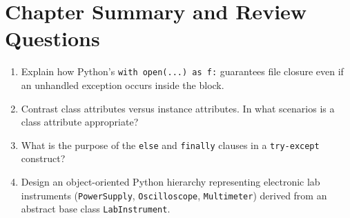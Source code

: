 \section{Chapter Summary and Review Questions}
\begin{enumerate}[leftmargin=1.8em, itemsep=4pt]
    \item Explain how Python's \texttt{with open(...) as f:} guarantees file closure even if an unhandled exception occurs inside the block.
    \item Contrast class attributes versus instance attributes. In what scenarios is a class attribute appropriate?
    \item What is the purpose of the \texttt{else} and \texttt{finally} clauses in a \texttt{try-except} construct?
    \item Design an object-oriented Python hierarchy representing electronic lab instruments (\texttt{PowerSupply}, \texttt{Oscilloscope}, \texttt{Multimeter}) derived from an abstract base class \texttt{LabInstrument}.
\end{enumerate}
